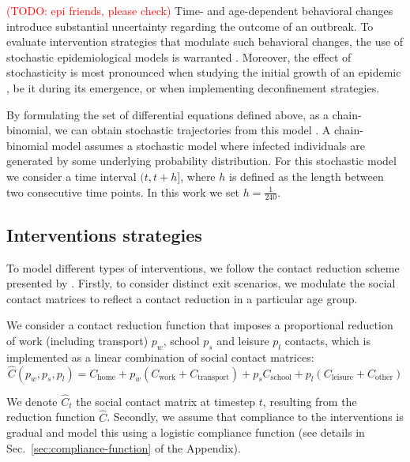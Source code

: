 \documentclass{article}
\renewcommand{\cite}[1]{\citep{#1}}
\newcommand\todo[1]{\textcolor{red}{(TODO: #1)}}
\newcommand{\chome}{C_{\text{home}}}
\newcommand{\cwork}{C_{\text{work}}}
\newcommand{\ctransport}{C_{\text{transport}}}
\newcommand{\cschool}{C_{\text{school}}}
\newcommand{\cleisure}{C_{\text{leisure}}}
\newcommand{\cother}{C_{\text{other}}}
\begin{document}
\todo{epi friends, please check} Time- and age-dependent behavioral changes introduce substantial uncertainty regarding the outcome of an outbreak. To evaluate intervention strategies that modulate such behavioral changes, the use of stochastic epidemiological models is warranted \cite{abrams2021modelling}. Moreover, the effect of stochasticity is most pronounced when studying the initial growth of an epidemic \cite{britton2009epidemic}, be it during its emergence, or when implementing deconfinement strategies.

By formulating the set of differential equations defined above, as a chain-binomial, we can obtain stochastic trajectories from this model \cite{bailey1975mathematical}. A chain-binomial model assumes a stochastic model where infected individuals are generated by some underlying probability distribution. For this stochastic model we consider a time interval $(t, t +h]$, where $h$ is defined as the length between two consecutive time points. In this work we set $h = \frac{1}{240}$.

\subsection{Interventions strategies}
\label{sec:interventions}
To model different types of interventions, we follow the contact reduction scheme presented by \citet{abrams2021modelling}. Firstly, to consider distinct exit scenarios, we modulate the social contact matrices to reflect a contact reduction in a particular age group.

We consider a contact reduction function that imposes a proportional reduction of work (including transport) $p_w$, school $p_s$ and leisure $p_l$ contacts, which is implemented as a linear combination of social contact matrices:
\begin{equation}
\label{eq:scm}
    \hat{C}(p_w, p_s, p_l) = \chome + p_w (\cwork + \ctransport) + p_s \cschool + p_l (\cleisure + \cother)
\end{equation}

We denote $\hat{C}_t$ the social contact matrix at timestep $t$, resulting from the reduction function $\hat{C}$. Secondly, we assume that compliance to the interventions is gradual and model this using a logistic compliance function (see details in Sec.~\ref{sec:compliance-function} of the Appendix).
\end{document}
